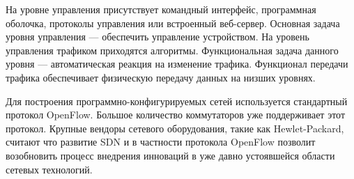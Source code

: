 На уровне управления присутствует командный интерфейс, программная оболочка, протоколы управления или встроенный веб-сервер.
Основная задача уровня управления --- обеспечить управление устройством.
На уровень управления трафиком приходятся алгоритмы.
Функциональная задача данного уровня --- автоматическая реакция на изменение трафика.
Функционал передачи трафика обеспечивает физическую передачу данных на низших уровнях.

Для построения программно-конфигурируемых сетей используется стандартный протокол OpenFlow.
Большое количество коммутаторов уже поддерживает этот протокол.
Крупные вендоры сетевого оборудования, такие как Hewlet-Packard, считают что развитие SDN и в частности протокола OpenFlow позволит возобновить процесс внедрения инноваций в уже давно устоявшейся области сетевых технологий.

\clearpage
